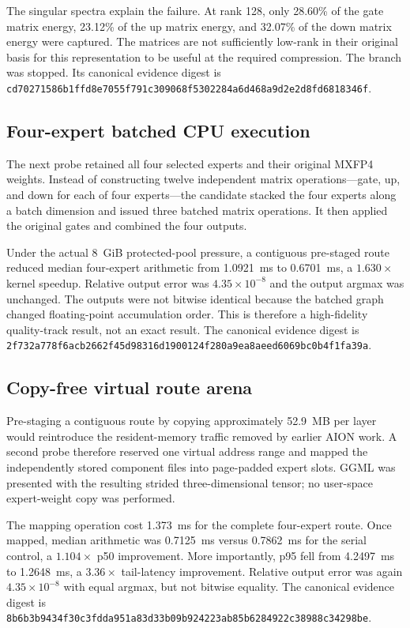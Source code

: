 The singular spectra explain the failure.  At rank 128, only 28.60\% of the
gate matrix energy, 23.12\% of the up matrix energy, and 32.07\% of the down
matrix energy were captured.  The matrices are not sufficiently low-rank in
their original basis for this representation to be useful at the required
compression.  The branch was stopped.  Its canonical evidence digest is
\texttt{cd70271586b1ffd8e7055f791c309068f5302284a6d468a9d2e2d8fd6818346f}.

\subsection{Four-expert batched CPU execution}

The next probe retained all four selected experts and their original MXFP4
weights.  Instead of constructing twelve independent matrix operations---gate,
up, and down for each of four experts---the candidate stacked the four experts
along a batch dimension and issued three batched matrix operations.  It then
applied the original gates and combined the four outputs.

Under the actual 8~GiB protected-pool pressure, a contiguous pre-staged route
reduced median four-expert arithmetic from 1.0921~ms to 0.6701~ms, a
$1.630\times$ kernel speedup.  Relative output error was
$4.35\times10^{-8}$ and the output argmax was unchanged.  The outputs were not
bitwise identical because the batched graph changed floating-point accumulation
order.  This is therefore a high-fidelity quality-track result, not an exact
result.  The canonical evidence digest is
\texttt{2f732a778f6acb2662f45d98316d1900124f280a9ea8aeed6069bc0b4f1fa39a}.

\subsection{Copy-free virtual route arena}

Pre-staging a contiguous route by copying approximately 52.9~MB per layer would
reintroduce the resident-memory traffic removed by earlier AION work.  A second
probe therefore reserved one virtual address range and mapped the independently
stored component files into page-padded expert slots.  GGML was presented with
the resulting strided three-dimensional tensor; no user-space expert-weight
copy was performed.

The mapping operation cost 1.373~ms for the complete four-expert route.  Once
mapped, median arithmetic was 0.7125~ms versus 0.7862~ms for the serial control,
a $1.104\times$ p50 improvement.  More importantly, p95 fell from 4.2497~ms to
1.2648~ms, a $3.36\times$ tail-latency improvement.  Relative output error was
again $4.35\times10^{-8}$ with equal argmax, but not bitwise equality.  The
canonical evidence digest is
\texttt{8b6b3b9434f30c3fdda951a83d33b09b924223ab85b6284922c38988c34298be}.

